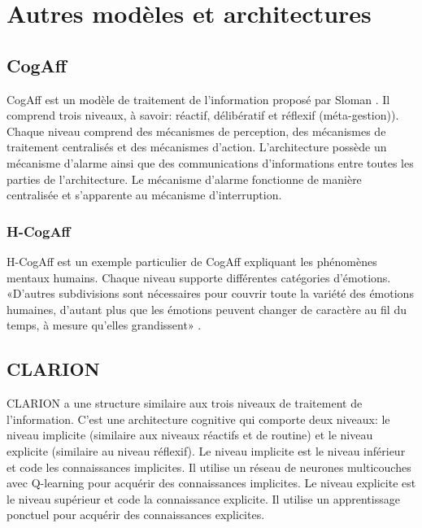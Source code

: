 
\chapter{Autres modèles et architectures} %

\label{Chapter5} %


\section{CogAff}

CogAff est un modèle de traitement de l'information proposé par Sloman \parencite{sloman2005architectural}. Il comprend trois niveaux, à savoir: réactif, délibératif et réflexif (méta-gestion)). 
Chaque niveau comprend des mécanismes de perception, des mécanismes de traitement centralisés et des mécanismes d'action. L'architecture possède un mécanisme d'alarme ainsi que des communications d'informations entre toutes les parties de l'architecture. Le mécanisme d'alarme fonctionne de manière centralisée et s'apparente au mécanisme d'interruption.





\subsection{H-CogAff}

H-CogAff est un exemple particulier de CogAff expliquant les phénomènes mentaux humains. Chaque niveau supporte différentes catégories d'émotions. «D'autres subdivisions sont nécessaires pour couvrir toute la variété des émotions humaines, d'autant plus que les émotions peuvent changer de caractère au fil du temps, à mesure qu'elles grandissent» \parencite{sloman2005architectural}.


\section{CLARION}

CLARION a une structure similaire aux trois niveaux de traitement de l’information. C'est une architecture cognitive qui comporte deux niveaux: le niveau implicite (similaire aux niveaux réactifs et de routine) et le niveau explicite (similaire au niveau réflexif). Le niveau implicite est le niveau inférieur et code les connaissances implicites. Il utilise un réseau de neurones multicouches avec Q-learning pour acquérir des connaissances implicites. Le niveau explicite est le niveau supérieur et code la connaissance explicite. Il utilise un apprentissage ponctuel pour acquérir des connaissances explicites.

